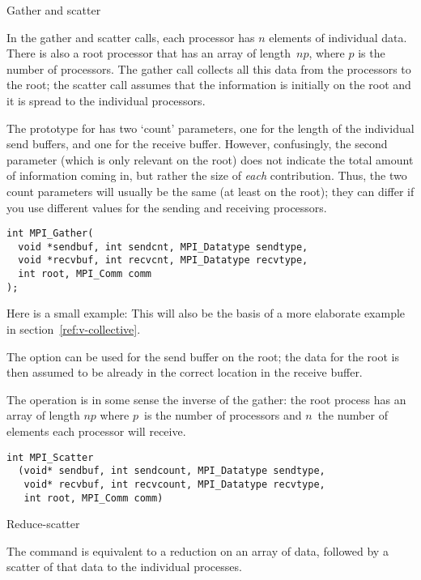  {Gather and scatter}

In the gather and scatter calls, each processor has $n$ elements of individual
data. There is also a root processor that has an array of length~$np$, where $p$
is the number of processors. The gather call collects all this data from the 
processors to the root; the scatter call assumes that the information is 
initially on the root and it is spread to the individual processors.

The prototype for  has two `count' parameters, one
for the length of the individual send buffers, and one for the receive buffer.
However, confusingly, the second parameter (which is only relevant on the root)
does not indicate the total amount of information coming in, but
rather the size of \emph{each} contribution. Thus, the two count parameters
will usually be the same (at least on the root); they can differ if you 
use different  values for the sending and receiving
processors.
\begin{verbatim}
int MPI_Gather(
  void *sendbuf, int sendcnt, MPI_Datatype sendtype,
  void *recvbuf, int recvcnt, MPI_Datatype recvtype,
  int root, MPI_Comm comm
);
\end{verbatim}

Here is a small example:
This will also be the basis of a more elaborate example in
section~\ref{ref:v-collective}.

The  option can be used for the send buffer on the root;
the data for the root is then assumed to be already in the correct location
in the receive buffer.

The  operation is in some sense the inverse of the gather:
the root process has an array of length $np$ where $p$~is the number of processors
and $n$~the number of elements each processor will receive.
\begin{verbatim}
int MPI_Scatter
  (void* sendbuf, int sendcount, MPI_Datatype sendtype, 
   void* recvbuf, int recvcount, MPI_Datatype recvtype, 
   int root, MPI_Comm comm) 
\end{verbatim}

 {Reduce-scatter}

The  command is equivalent to a reduction
on an array of data, followed by a scatter of that data to the individual processes.

